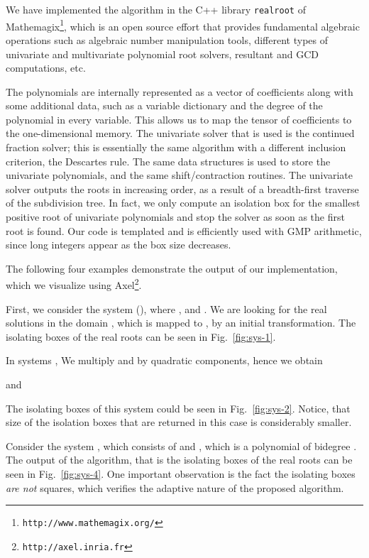 \documentclass{sig-alternate}
\def\axel{{\sc Axel}}
\def\mathemagix{{\sc Mathemagix}}
\begin{document}
We have implemented the algorithm in the C++ library \texttt{realroot} of  
\mathemagix\footnote{\texttt{http://www.mathemagix.org/}},
which is an open source effort that provides fundamental algebraic operations 
such as algebraic number manipulation tools, different types of univariate 
and multivariate polynomial root solvers, resultant and GCD computations, etc.

The polynomials are internally represented as a vector of coefficients
along with some additional data, such as a variable dictionary and the
degree of the polynomial in every variable. This allows us to map the
tensor of coefficients to the one-dimensional memory. The univariate
solver that is used is the continued fraction solver; this is
essentially the same algorithm with a different inclusion criterion,
the Descartes rule. The same data structures is used to store the
univariate polynomials, and the same shift/contraction routines. The
univariate solver outputs the roots in increasing order, as a result
of a breadth-first traverse of the subdivision tree. In fact, we only
compute an isolation box for the smallest positive root of univariate
polynomials and stop the solver as soon as the first root is
found. Our code is templated and is efficiently used with GMP
arithmetic, since long integers appear as the box size decreases.

The following four examples demonstrate the output of our implementation, 
which we visualize using \axel\footnote{\texttt{http://axel.inria.fr}}.

First, we consider the system  (), 
where , and .
We are looking for the real solutions in the domain 
, which is mapped to , by an initial
transformation. The isolating boxes of the real roots can be seen in
Fig.~\ref{fig:sys-1}. 

In systems , We multiply  and  by
quadratic components, hence we obtain

and 

The isolating boxes of this system could be seen in
Fig.~\ref{fig:sys-2}.  Notice, that
size of the isolation boxes that are returned in this case is
considerably smaller. 


Consider the system , which 
consists of  and , which is a polynomial of bidegree .
The output of the algorithm, that is the isolating boxes of the real roots can be seen in 
Fig.~\ref{fig:sys-4}.
One important observation is the fact the isolating boxes {\em are not} squares,
which verifies the adaptive nature of the proposed algorithm.
\end{document}
